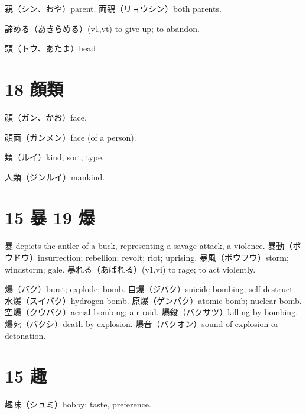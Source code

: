 親（シン、おや）parent.
両親（リョウシン）both parents.

諦める（あきらめる）(v1,vt)
to give up; to abandon.

頭（トウ、あたま）head

\section{18 顔類}

顔（ガン、かお）face.

顔面（ガンメン）face (of a person).

類（ルイ）kind; sort; type.

人類（ジンルイ）mankind.

\section{15 暴 19 爆}

暴 depicts the antler of a buck, representing a savage attack, a violence.
暴動（ボウドウ）insurrection; rebellion; revolt; riot; uprising.
暴風（ボウフウ）storm; windstorm; gale.
暴れる（あばれる）(v1,vi) to rage; to act violently.

爆（バク）burst; explode; bomb.
自爆（ジバク）suicide bombing; self-destruct.
水爆（スイバク）hydrogen bomb.
原爆（ゲンバク）atomic bomb; nuclear bomb.
空爆（クウバク）aerial bombing; air raid.
爆殺（バクサツ）killing by bombing.
爆死（バクシ）death by explosion.
爆音（バクオン）sound of explosion or detonation.

\section{15 趣}

趣味（シュミ）hobby; taste, preference.
